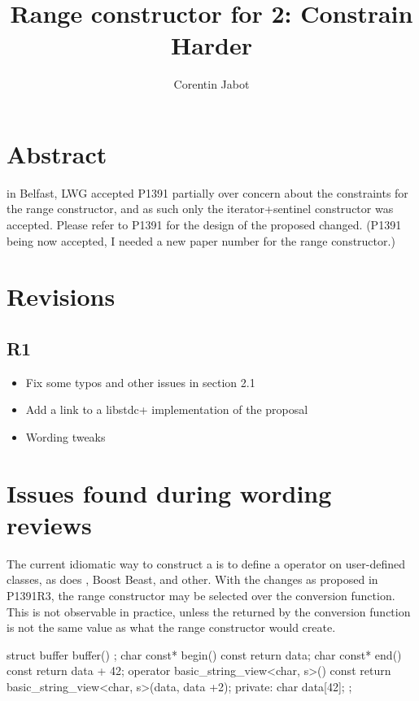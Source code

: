 \documentclass{wg21}
\title{Range constructor for \tcode{std::string\_view} 2: Constrain Harder}
\author{Corentin Jabot}{corentin.jabot@gmail.com}
\begin{document}
\maketitle

\section{Abstract}

in Belfast, LWG accepted P1391 partially over concern about the constraints for the range constructor, and as such only the iterator+sentinel
constructor was accepted. Please refer to P1391 for the design of the proposed changed.
(P1391 being now accepted, I needed a new paper number for the range constructor.)


\section{Revisions}

\subsection{R1}
\begin{itemize}
    \item Fix some typos and other issues in section 2.1
    \item Add a link to a libstdc+ implementation of the proposal
    \item Wording tweaks
\end{itemize}


\section{Issues found during wording reviews}

The current idiomatic way to construct a  is to define a  operator on user-defined classes, 
as does ,  Boost Beast,  and other.
With the changes as proposed in P1391R3, the range constructor may be selected over the conversion function.
This is not observable in practice, unless the  returned by the conversion function is not the same value as what the range constructor would create.

\begin{colorblock}
struct buffer {
   buffer() {};
   char const* begin() const { return data; }
   char const* end() const { return data + 42; }
   operator basic_string_view<char, s>() const{
      return basic_string_view<char, s>(data, data +2);
   }
private:
   char data[42];
};
\end{colorblock}
\end{document}
